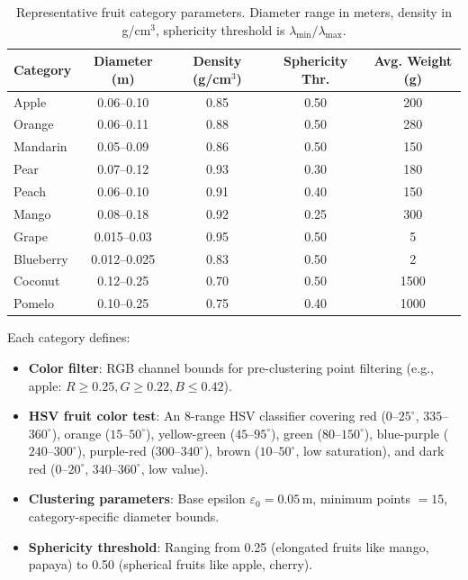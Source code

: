 \documentclass[article,final]{iclr2024_conference}
\begin{document}
\begin{table}[t]
\centering
\caption{Representative fruit category parameters. Diameter range in meters, density in g/cm$^3$, sphericity threshold is $\lambda_{\min}/\lambda_{\max}$.}
\label{tab:categories}
\small
\begin{tabular}{lcccc}
\toprule
Category & Diameter (m) & Density (g/cm$^3$) & Sphericity Thr. & Avg. Weight (g) \\
\midrule
Apple & 0.06--0.10 & 0.85 & 0.50 & 200 \\
Orange & 0.06--0.11 & 0.88 & 0.50 & 280 \\
Mandarin & 0.05--0.09 & 0.86 & 0.50 & 150 \\
Pear & 0.07--0.12 & 0.93 & 0.30 & 180 \\
Peach & 0.06--0.10 & 0.91 & 0.40 & 150 \\
Mango & 0.08--0.18 & 0.92 & 0.25 & 300 \\
Grape & 0.015--0.03 & 0.95 & 0.50 & 5 \\
Blueberry & 0.012--0.025 & 0.83 & 0.50 & 2 \\
Coconut & 0.12--0.25 & 0.70 & 0.50 & 1500 \\
Pomelo & 0.10--0.25 & 0.75 & 0.40 & 1000 \\
\bottomrule
\end{tabular}
\end{table}

Each category defines:
\begin{itemize}[leftmargin=*,nosep]
    \item \textbf{Color filter}: RGB channel bounds for pre-clustering point filtering (e.g., apple: $R \geq 0.25, G \geq 0.22, B \leq 0.42$).
    \item \textbf{HSV fruit color test}: An 8-range HSV classifier covering red ($0$--$25^\circ$, $335$--$360^\circ$), orange ($15$--$50^\circ$), yellow-green ($45$--$95^\circ$), green ($80$--$150^\circ$), blue-purple ($240$--$300^\circ$), purple-red ($300$--$340^\circ$), brown ($10$--$50^\circ$, low saturation), and dark red ($0$--$20^\circ$, $340$--$360^\circ$, low value).
    \item \textbf{Clustering parameters}: Base epsilon $\varepsilon_0 = 0.05$\,m, minimum points $= 15$, category-specific diameter bounds.
    \item \textbf{Sphericity threshold}: Ranging from 0.25 (elongated fruits like mango, papaya) to 0.50 (spherical fruits like apple, cherry).
\end{itemize}
\end{document}
